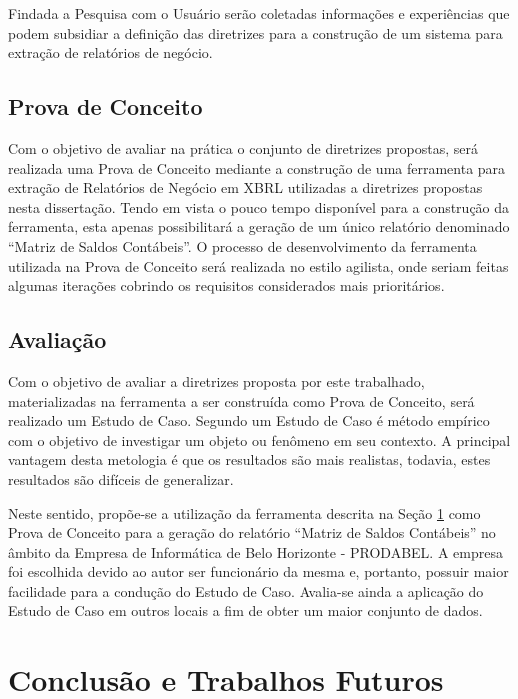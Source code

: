 \documentclass[msc,proposal,hidelot,hideabstract]{ppgccufmg} %
\begin{document}
Findada a Pesquisa com o Usuário serão coletadas informações e experiências que
podem subsidiar a definição das diretrizes para a construção de um sistema
para extração de relatórios de negócio.

\section{Prova de Conceito}
\label{sec:prova-conceito}

Com o objetivo de avaliar na prática o conjunto de diretrizes propostas, será
realizada uma Prova de Conceito mediante a construção de uma ferramenta para
extração de Relatórios de Negócio em XBRL utilizadas a diretrizes propostas
nesta dissertação. Tendo em vista o pouco tempo disponível para a construção da
ferramenta, esta apenas possibilitará a geração de um único relatório
denominado ``Matriz de Saldos Contábeis''. O processo de desenvolvimento da
ferramenta utilizada na Prova de Conceito será realizada no estilo agilista, onde seriam feitas algumas
iterações cobrindo os requisitos considerados mais prioritários.

\section{Avaliação}
\label{sec:avaliacao}

Com o objetivo de avaliar a diretrizes proposta por este trabalhado,
materializadas na ferramenta a ser construída como Prova de Conceito, será
realizado um Estudo de Caso. Segundo \cite{wohlin2012experimentation} um Estudo
de Caso é método empírico com o objetivo de investigar um objeto ou fenômeno em
seu contexto. A principal vantagem desta metologia é que os resultados são mais
realistas, todavia, estes resultados são difíceis de generalizar.

Neste sentido, propõe-se a utilização da ferramenta descrita na Seção \ref{sec:prova-conceito} como Prova de
Conceito para a geração do relatório ``Matriz de Saldos Contábeis'' no âmbito
da Empresa de Informática de Belo Horizonte - PRODABEL. A empresa foi escolhida
devido ao autor ser funcionário da mesma e, portanto, possuir maior facilidade
para a condução do Estudo de Caso. Avalia-se ainda a aplicação do Estudo de
Caso em outros locais a fim de obter um maior conjunto de dados.

\chapter{Conclusão e Trabalhos Futuros}
\label{ch:conclusao_trab_futuros}
\end{document}
